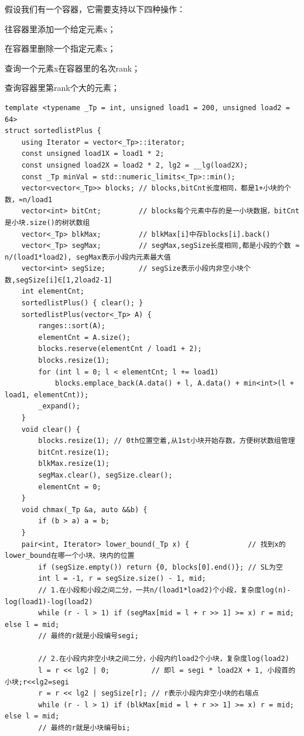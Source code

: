 \documentclass[UTF8,twoside]{ctexart}
\begin{document}
假设我们有一个容器，它需要支持以下四种操作：

往容器里添加一个给定元素x；

在容器里删除一个指定元素x；

查询一个元素x在容器里的名次rank；

查询容器里第rank个大的元素；

\begin{lstlisting}
template <typename _Tp = int, unsigned load1 = 200, unsigned load2 = 64>
struct sortedlistPlus {
    using Iterator = vector<_Tp>::iterator;
    const unsigned load1X = load1 * 2;
    const unsigned load2X = load2 * 2, lg2 = __lg(load2X);
    const _Tp minVal = std::numeric_limits<_Tp>::min();
    vector<vector<_Tp>> blocks; // blocks,bitCnt长度相同，都是1+小块的个数，≈n/load1
    vector<int> bitCnt;         // blocks每个元素中存的是一小块数据，bitCnt是小块.size()的树状数组
    vector<_Tp> blkMax;         // blkMax[i]中存blocks[i].back()
    vector<_Tp> segMax;         // segMax,segSize长度相同,都是小段的个数 ≈ n/(load1*load2), segMax表示小段内元素最大值
    vector<int> segSize;        // segSize表示小段内非空小块个数,segSize[i]∈[1,2load2-1]
    int elementCnt;
    sortedlistPlus() { clear(); }
    sortedlistPlus(vector<_Tp> A) {
        ranges::sort(A);
        elementCnt = A.size();
        blocks.reserve(elementCnt / load1 + 2);
        blocks.resize(1);
        for (int l = 0; l < elementCnt; l += load1)
            blocks.emplace_back(A.data() + l, A.data() + min<int>(l + load1, elementCnt));
        _expand();
    }
    void clear() {
        blocks.resize(1); // 0th位置空着,从1st小块开始存数，方便树状数组管理
        bitCnt.resize(1);
        blkMax.resize(1);
        segMax.clear(), segSize.clear();
        elementCnt = 0;
    }
    void chmax(_Tp &a, auto &&b) {
        if (b > a) a = b;
    }
    pair<int, Iterator> lower_bound(_Tp x) {              // 找到x的lower_bound在哪一个小块、块内的位置
        if (segSize.empty()) return {0, blocks[0].end()}; // SL为空
        int l = -1, r = segSize.size() - 1, mid;
        // 1.在小段和小段之间二分，一共n/(load1*load2)个小段，复杂度log(n)-log(load1)-log(load2)
        while (r - l > 1) if (segMax[mid = l + r >> 1] >= x) r = mid; else l = mid;
        // 最终的r就是小段编号segi;

        // 2.在小段内非空小块之间二分，小段内约load2个小块，复杂度log(load2)
        l = r << lg2 | 0;          // 即l = segi * load2X + 1, 小段首的小块;r<<lg2=segi
        r = r << lg2 | segSize[r]; // r表示小段内非空小块的右端点
        while (r - l > 1) if (blkMax[mid = l + r >> 1] >= x) r = mid; else l = mid;
        // 最终的r就是小块编号bi;


\end{lstlisting}
\end{document}
